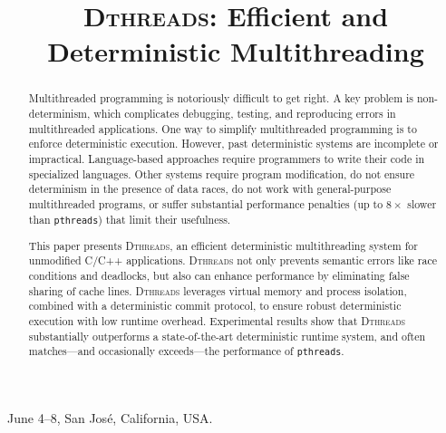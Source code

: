 \documentclass{sigplanconf}
\newcommand{\dthreads}{\textsc{Dthreads}}
\newcommand{\Dthreads}{\textsc{Dthreads}}
\newcommand{\pthreads}{\texttt{pthreads}}
\begin{document}
 {June 4--8, San Jos\'e, California, USA.}

\title{\textsc{Dthreads}: Efficient and Deterministic Multithreading}



\maketitle

\begin{comment}
\end{comment}

\begin{abstract}
Multithreaded programming is notoriously difficult to get right.  A
key problem is non-determinism, which complicates debugging, testing,
and reproducing errors in multithreaded applications. One way to
simplify multithreaded programming is to enforce deterministic
execution. However, past deterministic systems are incomplete
or impractical. Language-based approaches require programmers to write
their code in specialized languages. Other systems require program
modification, do not ensure determinism in the presence of data
races, do not work with general-purpose multithreaded programs, or
suffer substantial performance penalties (up to $8\times$ slower
than \pthreads{}) that limit their usefulness.

This paper presents \dthreads{}, an efficient deterministic
multithreading system for unmodified C/C++ applications. \Dthreads{}
not only prevents semantic errors like race conditions and deadlocks,
but also can enhance performance by eliminating false sharing of cache
lines. \dthreads{} leverages virtual memory and process isolation,
combined with a deterministic commit protocol, to ensure robust
deterministic execution with low runtime overhead. Experimental
results show that \dthreads{} substantially outperforms a
state-of-the-art deterministic runtime system, and often matches---and
occasionally exceeds---the performance of \pthreads{}.
\end{abstract}
\end{document}
